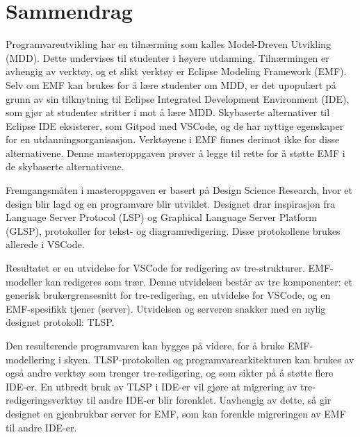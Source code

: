 \chapter*{Sammendrag}

Programvareutvikling har en tilnærming som kalles Model-Dreven Utvikling (MDD).
Dette undervises til studenter i høyere utdanning.
Tilnærmingen er avhengig av verktøy, og et slikt verktøy er Eclipse Modeling Framework (EMF).
Selv om EMF kan brukes for å lære studenter om MDD, er det upopulært på grunn av sin tilknytning til Eclipse Integrated Development Environment (IDE), som gjør at studenter stritter i mot å lære MDD.
Skybaserte alternativer til Eclipse IDE eksisterer, som Gitpod med VSCode, og de har nyttige egenskaper for en utdanningsorganisasjon.
Verktøyene i EMF finnes derimot ikke for disse alternativene.
Denne masteroppgaven prøver å legge til rette for å støtte EMF i de skybaserte alternativene.

Fremgangsmåten i masteroppgaven er basert på Design Science Research, hvor et design blir lagd og en programvare blir utviklet.
Designet drar inspirasjon fra Language Server Protocol (LSP) og Graphical Language Server Platform (GLSP), protokoller for tekst- og diagramredigering.
Disse protokollene brukes allerede i VSCode.

Resultatet er en utvidelse for VSCode for redigering av tre-strukturer.
EMF-modeller kan redigeres som trær.
Denne utvidelsen består av tre komponenter: et generisk brukergrensesnitt for tre-redigering, en utvidelse for VSCode, og en EMF-spesifikk tjener (server).
Utvidelsen og serveren snakker med en nylig designet protokoll: \acrfull{TLSP}.

Den resulterende programvaren kan bygges på videre, for å bruke EMF-modellering i skyen.
TLSP-protokollen og programvarearkitekturen kan brukes av også andre verktøy som trenger tre-redigering, og som sikter på å støtte flere IDE-er.
En utbredt bruk av TLSP i IDE-er vil gjøre at migrering av tre-redigeringsverktøy til andre IDE-er blir forenklet.
Uavhengig av dette, så gir designet en gjenbrukbar server for EMF, som kan forenkle migreringen av EMF til andre IDE-er.